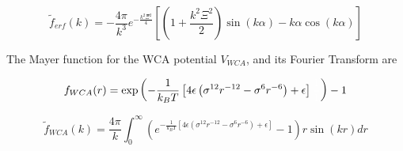 \documentclass[12pt]{article}
\begin{document}
\begin{equation}\widetilde{f}_{erf}(k)=-\frac{4\pi}{k^3}e^{-\frac{k^2\Xi^2}{4}}\left[\left(1+\frac{k^2\Xi^2}{2}\right)\sin(k\alpha)-k\alpha\cos(k\alpha)\right]\end{equation} 

The Mayer function for the WCA potential $V_{WCA}$, and its Fourier Transform are


\begin{equation}f_{WCA}(r)=\operatorname{exp}\left(-\frac{1}{k_BT}\left[4\epsilon\left(\sigma^{12}r^{-12}-\sigma^{6}r^{-6}\right)+\epsilon\right]\color{white}\frac{1}{1}\color{black}\right)-1\end{equation} 

\begin{equation}\widetilde{f}_{WCA}(k)=\frac{4\pi}{k}\int_0^{\infty}{\left(e^{-\frac{1}{k_BT}\left[4\epsilon\left(\sigma^{12}r^{-12}-\sigma^{6}r^{-6}\right)+\epsilon\right]}-1\right) r\sin(kr)dr}\end{equation} 




\[{}\]
\end{document}
